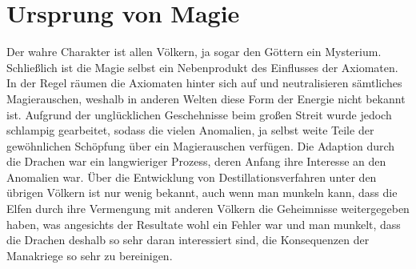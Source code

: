 \documentclass[a4paper,12pt,oneside]{book}
\begin{document}
\chapter{Ursprung von Magie}
Der wahre Charakter ist allen Völkern, ja sogar den Göttern ein Mysterium. Schließlich ist die Magie selbst ein Nebenprodukt des Einflusses der Axiomaten. In der Regel räumen die Axiomaten hinter sich auf und neutralisieren sämtliches Magierauschen, weshalb in anderen Welten diese Form der Energie nicht bekannt ist. Aufgrund der unglücklichen Geschehnisse beim großen Streit wurde jedoch schlampig gearbeitet, sodass die vielen Anomalien, ja selbst weite Teile der gewöhnlichen Schöpfung über ein Magierauschen verfügen. Die Adaption durch die Drachen war ein langwieriger Prozess, deren Anfang ihre Interesse an den Anomalien war. Über die Entwicklung von Destillationsverfahren unter den übrigen Völkern ist nur wenig bekannt, auch wenn man munkeln kann, dass die  Elfen durch ihre Vermengung mit anderen Völkern die Geheimnisse weitergegeben haben, was angesichts der Resultate wohl ein Fehler war und man munkelt, dass die Drachen deshalb so sehr daran interessiert sind, die Konsequenzen der Manakriege so sehr zu bereinigen.  
\end{document}
